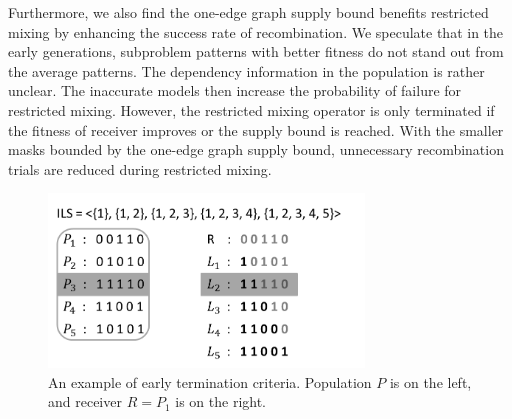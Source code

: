 \documentclass{sig-alternate-05-2015}
\begin{document}
Furthermore, we also find the one-edge graph supply bound benefits restricted mixing by enhancing the success rate of recombination. We speculate that in the early generations, subproblem patterns with better fitness do not stand out from the average patterns. The dependency information in the population is rather unclear. The inaccurate models then increase the probability of failure for restricted mixing. However, the restricted mixing operator is only terminated if the fitness of receiver improves or the supply bound is reached. With the smaller masks bounded by the one-edge graph supply bound, unnecessary recombination trials are reduced during restricted mixing. 

\begin{figure}
\centering
\includegraphics[width=3.3in]{IsinP}
\caption{An example of early termination criteria. Population $ P $ is on the left, and receiver $ R  = P_{1} $ is on the right.}
\end{figure}
\end{document}
